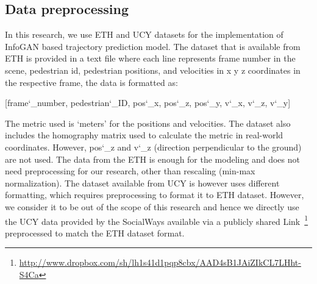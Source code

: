 \subsection{Data preprocessing}
In this research, we use ETH and UCY datasets for the implementation of InfoGAN based trajectory prediction model. The dataset that is available from ETH is provided in a text file where each line represents frame number in the scene, pedestrian id, pedestrian positions, and velocities in x y z coordinates in the respective frame, the data is formatted as:
\begin{center}
  [frame\char`_number, pedestrian\char`_ID, pos\char`_x, pos\char`_z, pos\char`_y, v\char`_x, v\char`_z, v\char`_y]
\end{center}
The metric used is `meters' for the positions and velocities. The dataset also includes the homography matrix used to calculate the metric in real-world coordinates. However, pos\char`_z and v\char`_z (direction perpendicular to the ground) are not used. The data from the ETH is enough for the modeling and does not need preprocessing for our research, other than rescaling (min-max normalization).\newline
The dataset available from UCY is however uses different formatting, which requires preprocessing to format it to ETH dataset. However, we consider it to be out of the scope of this research and hence we directly use the UCY data provided by the SocialWays\cite[]{DBLP:journals/corr/ChenDHSSA16} available via a publicly shared Link~\footnote{\url{http://www.dropbox.com/sh/lh1s41d1pqp8cbx/AAD4sB1JAiZIkCL7LHht-S4Ca}} preprocessed to match the ETH dataset format.

